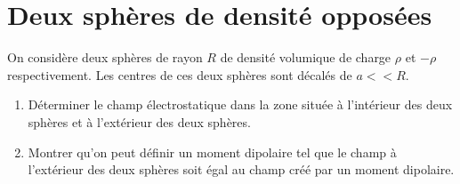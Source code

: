 \documentclass{article}
\begin{document}
\section{Deux sphères de densité opposées}

On considère deux sphères de rayon $R$ de densité volumique de charge $\rho$ et $-\rho$ respectivement.
Les centres de ces deux sphères sont décalés de $a <<R$. 
\begin{enumerate}
  \item Déterminer le champ électrostatique dans la zone située à l'intérieur des deux sphères et à l'extérieur des deux sphères. 
  \item Montrer qu'on peut définir un moment dipolaire tel que le champ à l'extérieur des deux sphères soit égal au champ créé par un moment dipolaire. \\[2cm]
\end{enumerate}


\end{document}
